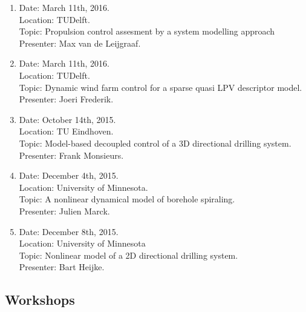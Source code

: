 \documentclass[main.tex]{subfiles}
\begin{document}
\begin{enumerate}
	\item Date: March 11th, 2016.\\
	Location: TUDelft.\\
	Topic: Propulsion control assesment by a system modelling approach\\
	Presenter: Max van de Leijgraaf.
	
	\item Date: March 11th, 2016.\\
	Location: TUDelft.\\
	Topic: Dynamic wind farm control for a sparse quasi LPV descriptor model.\\
	Presenter: Joeri Frederik.
	
	\item Date: October 14th, 2015.\\
	Location: TU Eindhoven.\\
	Topic: Model-based decoupled control of a 3D directional drilling system.\\
	Presenter: Frank Monsieurs.
	
	\item Date: December 4th, 2015.\\
	Location: University of Minnesota.\\
	Topic: A nonlinear dynamical model of borehole spiraling.\\
	Presenter: Julien Marck.
	
	\item Date: December 8th, 2015.\\
	Location:  University of Minnesota\\
	Topic: Nonlinear model of a 2D directional drilling system.\\
	Presenter: Bart Heijke.
	
\end{enumerate}

\subsection{Workshops}
\end{document}
